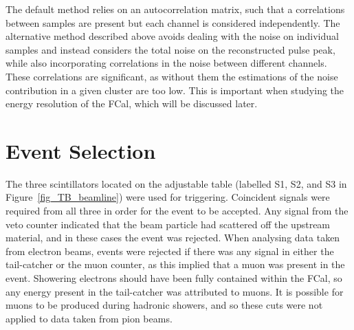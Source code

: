 The default method relies on an autocorrelation matrix, such that a correlations between samples are present but each channel is considered independently. The alternative method described above avoids dealing with the noise on individual samples and instead considers the total noise on the reconstructed pulse peak, while also incorporating correlations in the noise between different channels. These correlations are significant, as without them the estimations of the noise contribution in a given cluster are too low. This is important when studying the energy resolution of the FCal, which will be discussed later.


%
%
%
%
%
%
%
%
%
%
%
%
%
%
%
%
%
%
%   








%


\clearpage
\section{Event Selection}
\label{sec_event_selection}
The three scintillators located on the adjustable table (labelled S1, S2, and S3 in Figure~\ref{fig_TB_beamline}) were used for triggering. Coincident signals were required from all three in order for the event to be accepted. Any signal from the veto counter indicated that the beam particle had scattered off the upstream material, and in these cases the event was rejected. When analysing data taken from electron beams, events were rejected if there was any signal in either the tail-catcher or the muon counter, as this implied that a muon was present in the event. Showering electrons should have been fully contained within the FCal, so any energy present in the tail-catcher was attributed to muons. It is possible for muons to be produced during hadronic showers, and so these cuts were not applied to data taken from pion beams. 

